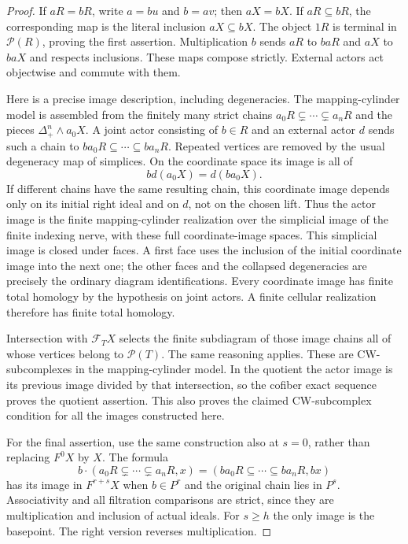 \begin{proof}
If $aR=bR$, write $a=bu$ and $b=av$; then $aX=bX$.
If $aR\subseteq bR$, the corresponding map is the literal inclusion
$aX\subseteq bX$.  The object $1R$ is terminal in $\mathcal P(R)$,
proving the first assertion.  Multiplication $b$ sends $aR$ to
$baR$ and $aX$ to $baX$ and respects inclusions.  These maps compose
strictly.  External actors act objectwise and commute with them.

Here is a precise image description, including degeneracies.
The mapping-cylinder model is assembled from the finitely many
strict chains $a_0R\subsetneq\cdots\subsetneq a_nR$ and the pieces
$\Delta^n_+\wedge a_0X$.  A joint actor consisting of $b\in R$ and
an external actor $d$ sends such a chain to
$ba_0R\subseteq\cdots\subseteq ba_nR$.  Repeated vertices are
removed by the usual degeneracy map of simplices.  On the coordinate
space its image is all of
\[
 b d(a_0X)=d(ba_0X).
\]
If different chains have the same resulting chain, this coordinate
image depends only on its initial right ideal and on $d$, not on the
chosen lift.  Thus the actor image is the finite mapping-cylinder
realization over the simplicial image of the finite indexing nerve,
with these full coordinate-image spaces.  This simplicial image is
closed under faces.  A first face uses the inclusion of the initial
coordinate image into the next one; the other faces and the collapsed
degeneracies are precisely the ordinary diagram identifications.
Every coordinate image has finite total homology by the hypothesis
on joint actors.  A finite cellular realization therefore has finite
total homology.

Intersection with $\mathcal F_T X$ selects the finite subdiagram of
those image chains all of whose vertices belong to $\mathcal P(T)$.
The same reasoning applies.  These are CW-subcomplexes in the
mapping-cylinder model.  In the quotient the actor image is its
previous image divided by that intersection, so the cofiber exact
sequence proves the quotient assertion.  This also proves the claimed
CW-subcomplex condition for all the images constructed here.

For the final assertion, use the same construction also at $s=0$,
rather than replacing $F^0X$ by $X$.  The formula
\[
 b\cdot(a_0R\subsetneq\cdots\subsetneq a_nR,x)
   =(ba_0R\subseteq\cdots\subseteq ba_nR,bx)
\]
has its image in $F^{r+s}X$ when $b\in P^r$ and the original chain
lies in $P^s$.  Associativity and all filtration comparisons are
strict, since they are multiplication and inclusion of actual
ideals.  For $s\geq h$ the only image is the basepoint.  The right
version reverses multiplication.
\end{proof}

